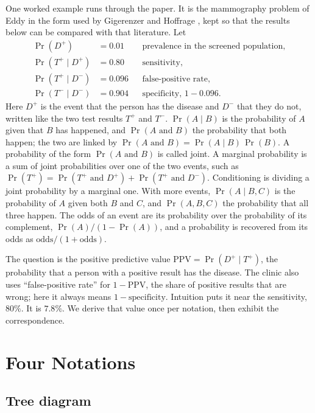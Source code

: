 \documentclass[11pt]{article}
\begin{document}
One worked example runs through the paper. It is the mammography problem of Eddy \cite{eddy1982} in the form used by Gigerenzer and Hoffrage \cite{gigerenzer1995}, kept so that the results below can be compared with that literature. Let
\begin{align*}
  \Pr(D^+) &= 0.01 && \text{prevalence in the screened population,}\\
  \Pr(T^+ \mid D^+) &= 0.80 && \text{sensitivity,}\\
  \Pr(T^+ \mid D^-) &= 0.096 && \text{false-positive rate,}\\
  \Pr(T^- \mid D^-) &= 0.904 && \text{specificity, } 1 - 0.096.
\end{align*}
Here $D^+$ is the event that the person has the disease and $D^-$ that they do not, written like the two test results $T^+$ and $T^-$. $\Pr(A \mid B)$ is the probability of $A$ given that $B$ has happened, and $\Pr(A \text{ and } B)$ the probability that both happen; the two are linked by $\Pr(A \text{ and } B) = \Pr(A \mid B)\,\Pr(B)$. A probability of the form $\Pr(A \text{ and } B)$ is called joint. A marginal probability is a sum of joint probabilities over one of the two events, such as $\Pr(T^+) = \Pr(T^+ \text{ and } D^+) + \Pr(T^+ \text{ and } D^-)$. Conditioning is dividing a joint probability by a marginal one. With more events, $\Pr(A \mid B, C)$ is the probability of $A$ given both $B$ and $C$, and $\Pr(A, B, C)$ the probability that all three happen. The odds of an event are its probability over the probability of its complement, $\Pr(A) / (1 - \Pr(A))$, and a probability is recovered from its odds as $\text{odds} / (1 + \text{odds})$.

The question is the positive predictive value $\mathrm{PPV} = \Pr(D^+ \mid T^+)$, the probability that a person with a positive result has the disease. The clinic also uses ``false-positive rate'' for $1 - \mathrm{PPV}$, the share of positive results that are wrong; here it always means $1 - \text{specificity}$. Intuition puts it near the sensitivity, $80\%$. It is $7.8\%$. We derive that value once per notation, then exhibit the correspondence.

\section{Four Notations}
\label{sec:four}

\subsection{Tree diagram}
\label{sec:tree}
\end{document}
